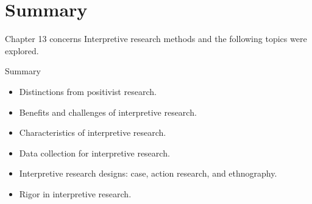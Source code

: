 \section{Summary}

Chapter 13 concerns Interpretive research methods and the following topics were explored.

\begin{center}
	\begin{tkawybox}{Summary}
		\begin{itemize}
			\setlength{\itemsep}{0pt}
			\setlength{\parskip}{0pt}
			\setlength{\parsep}{0pt}
			
			\item Distinctions from positivist research.
			\item Benefits and challenges of interpretive research.
			\item Characteristics of interpretive research.
			\item Data collection for interpretive research.
			\item Interpretive research designs: case, action research, and ethnography.
			\item Rigor in interpretive research.
		\end{itemize}
	\end{tkawybox}
\end{center}
